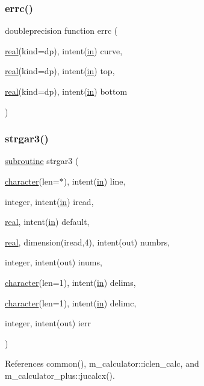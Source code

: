 \subsubsection{\texorpdfstring{errc()}{errc()}}
{\footnotesize\ttfamily doubleprecision function errc (\begin{DoxyParamCaption}\item[{\hyperlink{read__watch_83_8txt_abdb62bde002f38ef75f810d3a905a823}{real}(kind=dp), intent(\hyperlink{M__journal_83_8txt_afce72651d1eed785a2132bee863b2f38}{in})}]{curve,  }\item[{\hyperlink{read__watch_83_8txt_abdb62bde002f38ef75f810d3a905a823}{real}(kind=dp), intent(\hyperlink{M__journal_83_8txt_afce72651d1eed785a2132bee863b2f38}{in})}]{top,  }\item[{\hyperlink{read__watch_83_8txt_abdb62bde002f38ef75f810d3a905a823}{real}(kind=dp), intent(\hyperlink{M__journal_83_8txt_afce72651d1eed785a2132bee863b2f38}{in})}]{bottom }\end{DoxyParamCaption})}

\mbox{\label{strgar3_8f90_a0934cb639dc2db3450626e1515726e8c}} 
\subsubsection{\texorpdfstring{strgar3()}{strgar3()}}
{\footnotesize\ttfamily \hyperlink{M__stopwatch_83_8txt_acfbcff50169d691ff02d4a123ed70482}{subroutine} strgar3 (\begin{DoxyParamCaption}\item[{\hyperlink{option__stopwatch_83_8txt_abd4b21fbbd175834027b5224bfe97e66}{character}(len=$\ast$), intent(\hyperlink{M__journal_83_8txt_afce72651d1eed785a2132bee863b2f38}{in})}]{line,  }\item[{integer, intent(\hyperlink{M__journal_83_8txt_afce72651d1eed785a2132bee863b2f38}{in})}]{iread,  }\item[{\hyperlink{read__watch_83_8txt_abdb62bde002f38ef75f810d3a905a823}{real}, intent(\hyperlink{M__journal_83_8txt_afce72651d1eed785a2132bee863b2f38}{in})}]{default,  }\item[{\hyperlink{read__watch_83_8txt_abdb62bde002f38ef75f810d3a905a823}{real}, dimension(iread,4), intent(out)}]{numbrs,  }\item[{integer, intent(out)}]{inums,  }\item[{\hyperlink{option__stopwatch_83_8txt_abd4b21fbbd175834027b5224bfe97e66}{character}(len=1), intent(\hyperlink{M__journal_83_8txt_afce72651d1eed785a2132bee863b2f38}{in})}]{delims,  }\item[{\hyperlink{option__stopwatch_83_8txt_abd4b21fbbd175834027b5224bfe97e66}{character}(len=1), intent(\hyperlink{M__journal_83_8txt_afce72651d1eed785a2132bee863b2f38}{in})}]{delimc,  }\item[{integer, intent(out)}]{ierr }\end{DoxyParamCaption})}



References common(), m\+\_\+calculator\+::iclen\+\_\+calc, and m\+\_\+calculator\+\_\+plus\+::jucalcx().

